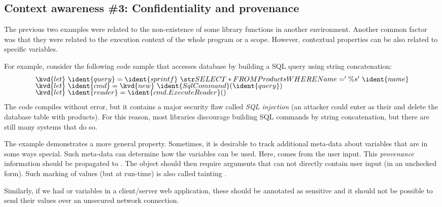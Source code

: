 
\subsection{Context awareness \#3: Confidentiality and provenance}

The previous two examples were related to the non-existence of some library functions in another
environment. Another common factor was that they were related to the execution context of the whole 
program or a scope. However, contextual properties can be also related to specific variables.

For example, consider the following code sample that accesses database by building a SQL query
using string concatenation:
%
\begin{equation*}
\begin{array}{l}
\kvd{let}~\ident{query} = \ident{sprintf}~\str{SELECT * FROM Products WHERE Name='\%s'}~\ident{name}\\[-0.25em]
\kvd{let}~\ident{cmd} = \kvd{new}~\ident{SqlCommand}(\ident{query})\\[-0.25em]
\kvd{let}~\ident{reader} = \ident{cmd.ExecuteReader}()
\end{array}
\end{equation*}
%
The code compiles without error, but it contains a major security flaw called \emph{SQL injection}
(an attacker could enter  as their  and delete the 
database table with products). For this reason, most libraries discourage building SQL commands by
string concatenation, but there are still many systems that do so. 

The example demonstrates a more general property. Sometimes, it is desirable to track additional 
meta-data about variables that are in some ways special. Such meta-data can determine how the variables
can be used. Here,  comes from the user input. This \emph{provenance} information should 
be propagated to . The  object should then require arguments that can
not directly contain user input (in an unchecked form). Such marking of values (but at run-time)
is also called tainting \cite{app-tainting-sql}.

Similarly, if we had  or  variables in a client/server web application,
these should be annotated as sensitive and it should not be possible to send their values over an
unsecured network connection. 
 
